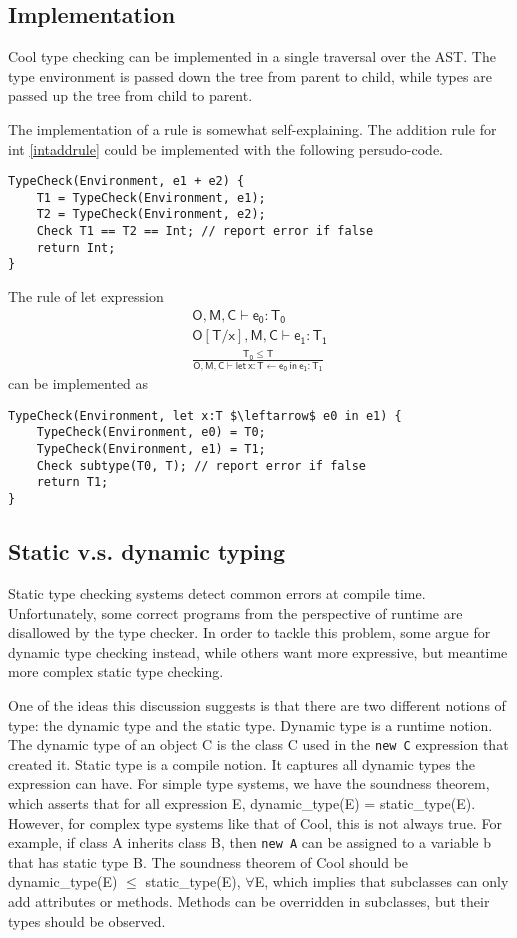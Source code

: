 \subsection{Implementation}
Cool type checking can be implemented in a single traversal over the AST. The type environment is passed down the tree from parent to child, while types are passed up the tree from child to parent.

The implementation of a rule is somewhat self-explaining. The addition rule for int \eqref{intaddrule} could be implemented with the following persudo-code.
\begin{lstlisting}
TypeCheck(Environment, e1 + e2) {
	T1 = TypeCheck(Environment, e1);
	T2 = TypeCheck(Environment, e2);
	Check T1 == T2 == Int; // report error if false
	return Int;
}
\end{lstlisting}
The rule of {\sf let} expression 
\begin{gather*}
\mathsf{O,M,C\vdash e_0:T_0}\\
\mathsf{O[T/x],M,C\vdash e_1:T_1}\\
\mathsf{\frac{T_0\leq T}{ O,M,C\vdash let\:x:T\leftarrow e_0\:in\:e_1:T_1}}
\end{gather*}
can be implemented as 
\begin{lstlisting}[mathescape = true]
TypeCheck(Environment, let x:T $\leftarrow$ e0 in e1) {
	TypeCheck(Environment, e0) = T0;
	TypeCheck(Environment, e1) = T1;
	Check subtype(T0, T); // report error if false
	return T1;
}
\end{lstlisting}
\subsection{Static v.s. dynamic typing}
Static type checking systems detect common errors at compile time. Unfortunately, some correct programs from the perspective of runtime are disallowed by the type checker. In order to tackle this problem, some argue for dynamic type checking instead, while others want more expressive, but meantime more complex static type checking. 

One of the ideas this discussion suggests is that there are two different notions of type: the dynamic type and the static type. Dynamic type is a runtime notion. The dynamic type of an object C is the class C used in the \texttt{new C} expression that created it. Static type is a compile notion. It captures all dynamic types the expression can have. For simple type systems, we have the soundness theorem, which asserts that for all expression E, dynamic\_type(E) = static\_type(E). However, for complex type systems like that of Cool, this is not always true. For example, if class A inherits class B, then \texttt{new A} can be assigned to a variable b that has static type B. The soundness theorem of Cool should be dynamic\_type(E) $\leq$ static\_type(E), $\forall$E, which implies that subclasses can only add attributes or methods. Methods can be overridden in subclasses, but their types should be observed.
